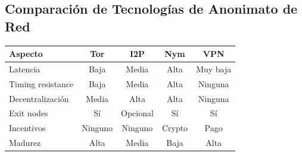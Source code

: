 \documentclass[11pt,a4paper,twoside]{book}
\begin{document}
\subsection{Comparaci\'on de Tecnolog\'ias de Anonimato de Red}

\begin{center}
\begin{tabular}{lcccc}
\toprule
\textbf{Aspecto} & \textbf{Tor} & \textbf{I2P} & \textbf{Nym} & \textbf{VPN} \\
\midrule
Latencia & Baja & Media & Alta & Muy baja \\
Timing resistance & Baja & Media & Alta & Ninguna \\
Decentralizaci\'on & Media & Alta & Alta & Ninguna \\
Exit nodes & S\'i & Opcional & S\'i & S\'i \\
Incentivos & Ninguno & Ninguno & Crypto & Pago \\
Madurez & Alta & Media & Baja & Alta \\
\bottomrule
\end{tabular}
\end{center}
\end{document}
